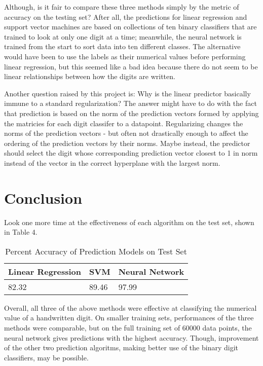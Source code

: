 \documentclass{article}
\begin{document}
Although, is it fair to compare these three methods simply by the metric of accuracy on the testing set? After all, the predictions for linear regression and support vector machines are based on collections of ten binary classifiers that are trained to look at only one digit at a time; meanwhile, the neural network is trained from the start to sort data into ten different classes. The alternative would have been to use the labels as their numerical values before performing linear regression, but this seemed like a bad idea because there do not seem to be linear relationships between how the digits are written. 

Another question raised by this project is: Why is the linear predictor basically immune to a standard regularization? The answer might have to do with the fact that prediction is based on the norm of the prediction vectors formed by applying the matricies for each digit classifer to a datapoint. Regularizing changes the norms of the prediction vectors - but often not drastically enough to affect the ordering of the prediction vectors by their norms. Maybe instead, the predictor should select the digit whose corresponding prediction vector closest to 1 in norm instead of the vector in the correct hyperplane with the largest norm.


\section{Conclusion} Look one more time at the effectiveness of each algorithm on the test set, shown in Table 4. 
\begin{table}
  \caption{Percent Accuracy of Prediction Models on Test Set}
  \label{sample-table}
  \centering
  \begin{tabular}{lll}
    \toprule
    Linear Regression     & SVM     & Neural Network \\
    \midrule
    82.32 & 89.46  & 97.99    \\
    
    \bottomrule
  \end{tabular}
\end{table}

Overall, all three of the above methods were effective at classifying the numerical value of a handwritten digit. On smaller training sets, performances of the three methods were comparable, but on the full training set of 60000 data points, the neural network gives predictions with the highest accuracy. Though, improvement of the other two prediction algoritms, making better use of the binary digit classifiers, may be possible.
\end{document}
